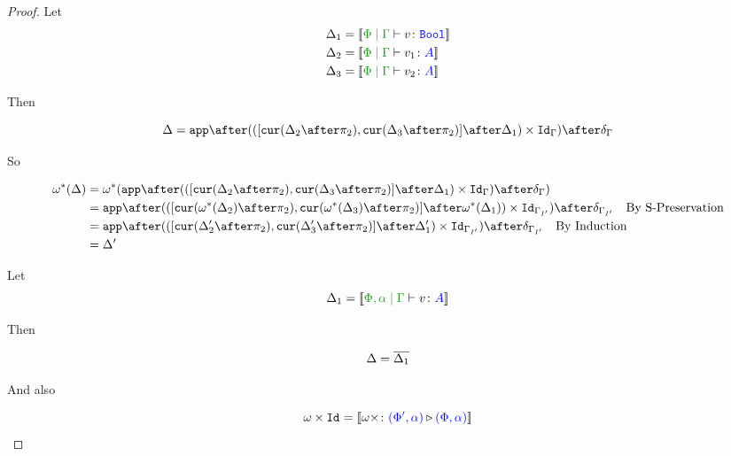 \documentclass{report}
\begin{document}
\begin{framed}
\begin{proof}
        \case{\vif}
        
        Let \begin{align*}
            \D_1 &= \deno{\gpetyperelation{v}{\B}}\\
            \D_2 &= \deno{\gpetyperelation{v_1}{A}}\\
            \D_3 &= \deno{\gpetyperelation{v_2}{A}}\\
        \end{align*}
        
        Then
        
        \begin{equation}
            \D = \app\after(([\cur{\D_2\after\pp}, \cur{\D_3\after\pp}]\after\D_1)\times\Id{\G})\after\diag{\G}\\
        \end{equation}
        
        So
        
        \begin{align*}
            \w\star(\D) &= \w\star(\app\after(([\cur{\D_2\after\pp}, \cur{\D_3\after\pp}]\after\D_1)\times\Id{\G})\after\diag{\G})\\
            &= \app\after(([\cur{\w\star(\D_2)\after\pp}, \cur{\w\star(\D_3)\after\pp}]\after\w\star(\D_1))\times\Id{\G_{I'}})\after\diag{\G_{I'}}\qt{By S-Preservation}\\
            &= \app\after(([\cur{\D_2'\after\pp}, \cur{\D_3'\after\pp}]\after\D_1')\times\Id{\G_{I'}})\after\diag{\G_{I'}}\qt{By Induction}\\
            & = \D'\\
        \end{align*}
        
        
        \case{\vgen}
        
        Let \begin{equation}
            \D_1 = \deno{\etyperelation{\P,\a}{\G}{v}{A}}
        \end{equation}
        
        Then
        
        \begin{equation}
            \Delta = \overline{\Delta_1}\\
        \end{equation}
        
        And also
        
        \begin{equation}
            \omega\times\texttt{Id}_{} = {\bf [\![}\omega\times \colon {\color{blue}(\Phi',\alpha)} \triangleright {\color {blue} (\Phi,\alpha)}{\bf ]\!]}
        \end{equation}
        

\end{proof}
\end{framed}
\end{document}
